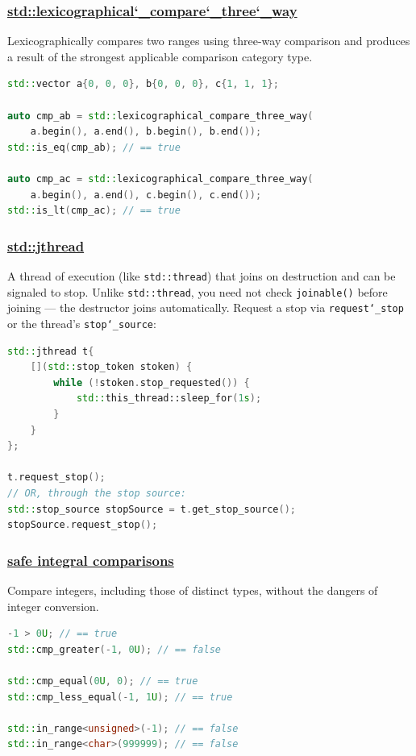 \subsubsection{\href{https://github.com/AnthonyCalandra/modern-cpp-features/tree/master\#stdlexicographical_compare_three_way}
                    {std::lexicographical\char`_compare\char`_three\char`_way}}
Lexicographically compares two ranges using three-way comparison and produces 
a result of the strongest applicable comparison category type.
\begin{lstlisting}[language=C++]
std::vector a{0, 0, 0}, b{0, 0, 0}, c{1, 1, 1};

auto cmp_ab = std::lexicographical_compare_three_way(
    a.begin(), a.end(), b.begin(), b.end());
std::is_eq(cmp_ab); // == true

auto cmp_ac = std::lexicographical_compare_three_way(
    a.begin(), a.end(), c.begin(), c.end());
std::is_lt(cmp_ac); // == true
\end{lstlisting}

\subsubsection{\href{https://github.com/AnthonyCalandra/modern-cpp-features/tree/master\#stdjthread}
                    {std::jthread}}
A thread of execution (like \texttt{std::thread}) that joins on destruction and 
can be signaled to stop. Unlike \texttt{std::thread}, you need not check 
\texttt{joinable()} before joining --- the destructor joins automatically.
Request a stop via \texttt{request\char`_stop} or the thread's \texttt{stop\char`_source}:
\begin{lstlisting}[language=C++]
std::jthread t{
    [](std::stop_token stoken) {
        while (!stoken.stop_requested()) {
            std::this_thread::sleep_for(1s);
        }
    }
};

t.request_stop();
// OR, through the stop source:
std::stop_source stopSource = t.get_stop_source();
stopSource.request_stop();
\end{lstlisting}

\subsubsection{\href{https://github.com/AnthonyCalandra/modern-cpp-features/tree/master\#safe-integral-comparisons}
                    {safe integral comparisons}}
Compare integers, including those of distinct types, without the dangers of 
integer conversion.
\begin{lstlisting}[language=C++]
-1 > 0U; // == true
std::cmp_greater(-1, 0U); // == false

std::cmp_equal(0U, 0); // == true
std::cmp_less_equal(-1, 1U); // == true

std::in_range<unsigned>(-1); // == false
std::in_range<char>(999999); // == false
\end{lstlisting}

